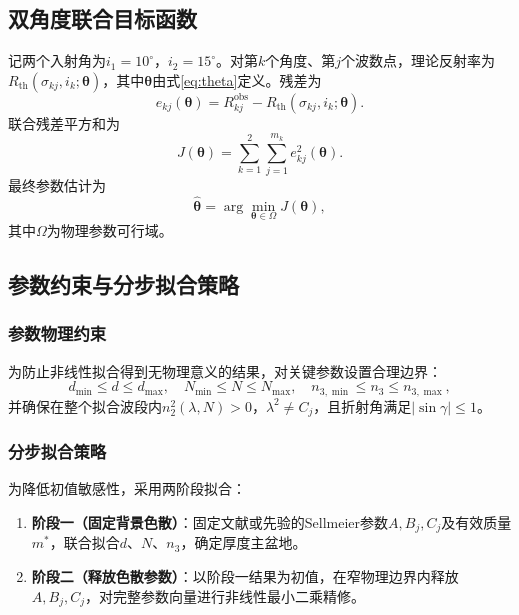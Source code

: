 \documentclass[12pt,a4paper]{ctexart}
\begin{document}
	\subsection{双角度联合目标函数}
	记两个入射角为$i_1=10^\circ$，$i_2=15^\circ$。对第$k$个角度、第$j$个波数点，理论反射率为$R_{\mathrm{th}}(\sigma_{kj}, i_k; \boldsymbol\theta)$，其中$\boldsymbol\theta$由式\eqref{eq:theta}定义。残差为
	\begin{equation}
		e_{kj}(\boldsymbol\theta) = R_{kj}^{\mathrm{obs}} - R_{\mathrm{th}}(\sigma_{kj}, i_k; \boldsymbol\theta).
	\end{equation}
	联合残差平方和为
	\begin{equation}
		J(\boldsymbol\theta) = \sum_{k=1}^{2}\sum_{j=1}^{m_k} e_{kj}^2(\boldsymbol\theta).
		\label{eq:joint_obj}
	\end{equation}
	最终参数估计为
	\begin{equation}
		\widehat{\boldsymbol\theta} = \arg\min_{\boldsymbol\theta\in\Omega} J(\boldsymbol\theta),
		\label{eq:argmin}
	\end{equation}
	其中$\Omega$为物理参数可行域。
	
	\subsection{参数约束与分步拟合策略}
	
	\subsubsection{参数物理约束}
	为防止非线性拟合得到无物理意义的结果，对关键参数设置合理边界：
	\begin{equation}
		d_{\min}\le d\le d_{\max},\quad
		N_{\min}\le N\le N_{\max},\quad
		n_{3,\min}\le n_3\le n_{3,\max},
	\end{equation}
	并确保在整个拟合波段内$n_2^2(\lambda,N)>0$，$\lambda^2\ne C_j$，且折射角满足$|\sin\gamma|\le 1$。
	
	\subsubsection{分步拟合策略}
	为降低初值敏感性，采用两阶段拟合：
	
	\begin{enumerate}[leftmargin=2em]
		\item \textbf{阶段一（固定背景色散）}：固定文献或先验的Sellmeier参数$A,B_j,C_j$及有效质量$m^*$，联合拟合$d$、$N$、$n_3$，确定厚度主盆地。
		\item \textbf{阶段二（释放色散参数）}：以阶段一结果为初值，在窄物理边界内释放$A,B_j,C_j$，对完整参数向量进行非线性最小二乘精修。
	\end{enumerate}
	
\end{document}
